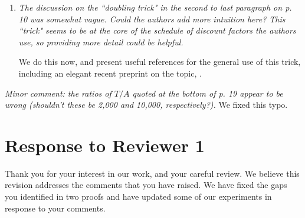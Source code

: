 \documentclass[11pt]{article}
\newcommand{\1}{\ensuremath{\mathbf{1}}} %
\theoremstyle{thm-sf}
\begin{document}
\begin{enumerate}
{\color{blue} TODO: Eli, lets discuss}		
Thank you for this excellent suggestion. First, in the case of $OGI(1)$ special structure lets us solve for this index very quickly via Newton-Raphson (we discuss this in the manuscript). For $OGI(\infty)$ we rely on Gittins index approximation from the literature, including \cite{brezzi2002optimal, powell2012optimal}. For $OGI(k)$, implemented for the Beta-Bernoulli case, we relied on a relatively naive implementation that was sufficiently fast for our setup -- we believe this is primarily because the number of dynamic programs to solve for an index evaluation can be made quite small by heuristically guessing useful intervals for the index. We do believe that in general, the parametric LP you suggest is precisely the right tool. In the Beta-Bernoulli case, however, the state space considered at each time step is distinct (effectively, we consider the set of states that are reachable in $k$ steps from the current state), and this requires setting up new LPs at each time step; the overhead in doing this ends up being quite significant.
		
		
		\item {\it The discussion on the ``doubling trick" in the second to last paragraph on p. 10 was somewhat vague. Could the authors add more intuition here? This ``trick" seems to be at the core of the schedule of discount factors the authors use, so providing more detail could be helpful.}
		
We do this now, and present useful references for the general use of this trick, including an elegant recent preprint on the topic, \cite{besson2018doubling}. 
		

	\end{enumerate}
	
	{\it \noindent Minor comment: the ratios of $T/A$ quoted at the bottom of p. 19 appear to be wrong (shouldn't these be 2,000 and 10,000, respectively?).}
	\newline
	\newline
	We fixed this typo.
	
	\newpage
	\section{Response to  Reviewer 1}
	
	Thank you for your interest in our work, and your careful review. We believe this revision addresses the comments that you have raised. We have fixed the gaps you identified in two proofs and have updated some of our experiments in response to your comments.  
	
\end{document}
